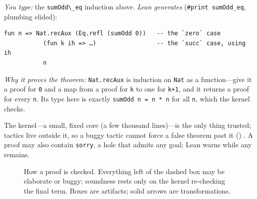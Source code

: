 \documentclass[11pt]{article}
\newcommand{\code}[1]{\lstinline[basicstyle=\ttfamily]|#1|}
\begin{document}
\medskip
\emph{You type:} the \code{sumOdd\_eq} induction above. \emph{Lean generates}
(\texttt{\#print sumOdd\_eq}, plumbing elided):
\begin{lstlisting}
fun n => Nat.recAux (Eq.refl (sumOdd 0))   -- the `zero` case
           (fun k ih => …)                 -- the `succ` case, using ih
           n
\end{lstlisting}
\emph{Why it proves the theorem:} \code{Nat.recAux} is induction on \code{Nat}
as a function---give it a proof for \code{0} and a map from a proof for \code{k}
to one for \code{k+1}, and it returns a proof for every \code{n}. Its type here
is exactly \code{sumOdd n = n * n} for all \code{n}, which the kernel checks.

\medskip\noindent The kernel---a small, fixed core (a few thousand lines)---is the
only thing trusted; tactics live outside it, so a buggy tactic cannot force a
false theorem past it () \cite{demoura-lean4}. A proof may also
contain \code{sorry}, a hole that admits any goal; Lean warns while any remains.

\begin{figure}[t]
\centering
{}
\caption{How a proof is checked. Everything left of the dashed box may be
elaborate or buggy; soundness rests only on the kernel re-checking the final
term. Boxes are artifacts; solid arrows are transformations.}
\label{fig:pipeline}
\end{figure}
\end{document}
